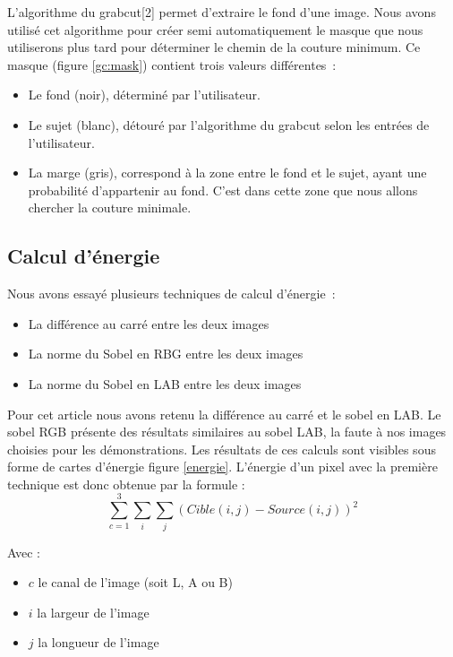 \documentclass[a4paper]{article}
\begin{document}
L'algorithme du grabcut[2] permet d'extraire le fond d'une image. 
Nous avons utilisé cet algorithme pour créer semi automatiquement le masque que nous utiliserons plus tard
pour déterminer le chemin de la couture minimum. 
Ce masque (figure \ref{gc:mask}) contient trois valeurs différentes~:

\begin{itemize}
    \item Le fond (noir), déterminé par l'utilisateur. 
    \item Le sujet (blanc), détouré par l'algorithme du grabcut selon les entrées de l'utilisateur.
    \item La marge (gris), correspond à la zone entre le fond et le sujet, ayant une probabilité d'appartenir au fond. C'est dans cette zone que nous allons chercher la couture minimale.
\end{itemize}

\subsection{Calcul d'énergie}

Nous avons essayé plusieurs techniques de calcul d'énergie~:

\begin{itemize}
    \item La différence au carré entre les deux images
    \item La norme du Sobel en RBG entre les deux images
    \item La norme du Sobel en LAB entre les deux images
\end{itemize}

Pour cet article nous avons retenu la différence au carré et le sobel en LAB. Le sobel RGB présente des résultats
similaires au sobel LAB, la faute à nos images choisies pour les démonstrations. %
Les résultats de ces calculs sont visibles sous forme de cartes d'énergie figure \ref{energie}.
L'énergie d'un pixel avec la première technique est donc obtenue par la formule :
\[
    \sum_{c=1}^{3} \sum_{i} \sum_{j} (Cible (i,j) - Source (i,j))^2
\]

Avec :
\begin{itemize}
    \item $c$ le canal de l'image (soit L, A ou B)
    \item $i$ la largeur de l'image
    \item $j$ la longueur de l'image
\end{itemize}
\end{document}
